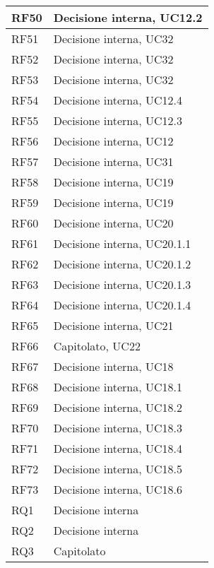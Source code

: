 \begin{center}
\begin{longtable}{|C{5cm}|C{5cm}|}
        RF50 & Decisione interna, UC12.2 \\
        \hline
        RF51 & Decisione interna, UC32 \\
        \hline
        RF52 & Decisione interna, UC32 \\
        \hline
        RF53 & Decisione interna, UC32 \\
        \hline
        RF54 & Decisione interna, UC12.4 \\
        \hline
        RF55 & Decisione interna, UC12.3 \\
        \hline
        RF56 & Decisione interna, UC12 \\
        \hline
        RF57 & Decisione interna, UC31 \\
        \hline
        RF58 & Decisione interna, UC19 \\
        \hline
        RF59 & Decisione interna, UC19 \\
        \hline
        RF60 & Decisione interna, UC20 \\
        \hline
        RF61 & Decisione interna, UC20.1.1 \\
        \hline
        RF62 & Decisione interna, UC20.1.2 \\
        \hline
        RF63 & Decisione interna, UC20.1.3 \\
        \hline
        RF64 & Decisione interna, UC20.1.4 \\
        \hline
        RF65 & Decisione interna, UC21 \\
        \hline
        RF66 & Capitolato, UC22 \\
        \hline
        RF67 & Decisione interna, UC18 \\
        \hline
        RF68 & Decisione interna, UC18.1 \\
        \hline
        RF69 & Decisione interna, UC18.2 \\
        \hline
        RF70 & Decisione interna, UC18.3 \\
        \hline
        RF71 & Decisione interna, UC18.4 \\
        \hline
        RF72 & Decisione interna, UC18.5 \\
        \hline
        RF73 & Decisione interna, UC18.6 \\
        \hline
        RQ1 & Decisione interna \\
        \hline
        RQ2 & Decisione interna \\
        \hline
        RQ3 & Capitolato \\

\end{longtable}
\end{center}
